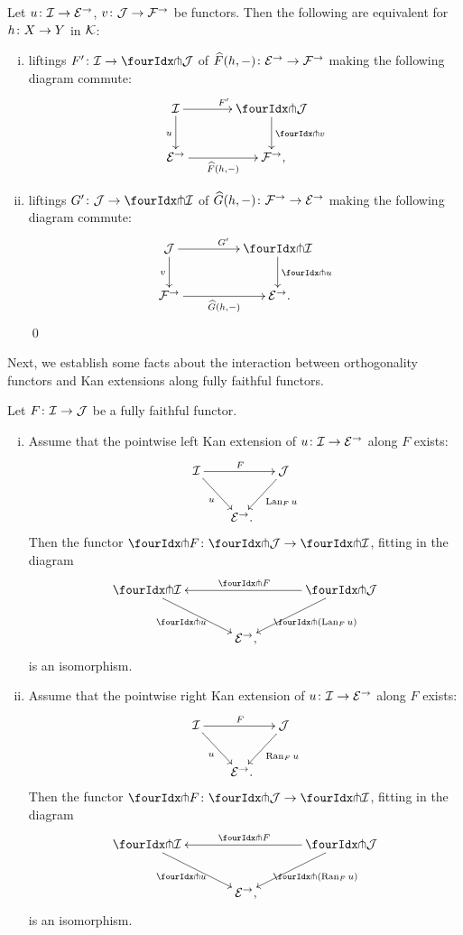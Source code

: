 \documentclass[reqno,10pt,a4paper,oneside,draft]{amsart}
\begin{document}
{{\begin{proposition} \label{lift-of-leibniz-adjunction}
Let $u \co \cal{I} \to \catE^\to$, $v \co \cal{J} \to \cal{F}^\to$ be functors.
Then the following are equivalent for $h \co X \to Y$ in $\cal{K}$:
\begin{enumerate}[(i)]
\item liftings $F' \co \cal{I} \to \liftl{\cal{J}}$ of $\widehat{F}(h, \arghole) \co \catE^\to \to \cal{F}^\to$ making the following diagram commute:
\[
\xymatrix@C=1.2cm{
  \cal{I}
  \ar[r]^{F'}
  \ar[d]_{u}
&
  \liftl{\cal{J}}
  \ar[d]^{\liftl{v}}
\\
  \catE^\to
  \ar[r]_-{\widehat{F}(h, \arghole)}
&
  \cal{F}^\to
\rlap{,}}
\]
\item liftings $G' \co \cal{J} \to \liftr{\cal{I}}$ of $\widehat{G}(h, \arghole) \co \cal{F}^\to \to \catE^\to$ making the following diagram commute:
\[
\begin{gathered}
\xymatrix@C+2em{
  \cal{J}
  \ar[d]_{v}
  \ar[r]^{G'}
&
  \liftr{\cal{I}}
  \ar[d]^{\liftr{u}}
\\
  \cal{F}^\to
  \ar[r]_-{\widehat{G}(h, \arghole)}
&
  \catE^\to  
\rlap{.}}
\end{gathered}
\]
 \qed
\end{enumerate}
\end{proposition}


Next, we establish some facts about the interaction between orthogonality functors and Kan extensions along fully faithful functors.

\begin{proposition} \label{kan-extension-closure}
Let $F \co \cal{I} \to \cal{J}$ be a fully faithful functor.
\begin{enumerate}[(i)]
\item Assume that the pointwise left Kan extension of $u \co \cal{I} \to \catE^\to$ along $F$ exists:
\[
\xymatrix@!C@C-1em{
  \cal{I}
  \ar[dr]_{u}
  \ar[rr]^{F}
&&
  \cal{J}
  \ar[dl]^{\Lan_F u}
\\&
  \catE^\to
\rlap{.}}
\]
Then the functor $\liftr{F} \co \liftr{\cal{J}} \to \liftr{\cal{I}}$, fitting in the diagram
\[
\xymatrix@!C@C-1em{
  \liftr{\cal{I}}
  \ar[dr]_{\liftr{u}}
&&
  \liftr{\cal{J}}
  \ar[ll]_{\liftr{F}}
  \ar[dl]^{\liftr{(\Lan_F u)}}
\\&
  \catE^\to
\rlap{,}}
\]
is an isomorphism.
\item Assume that the pointwise right Kan extension of $u \co \cal{I} \to \catE^\to$ along $F$ exists:
\[
\xymatrix@!C@C-1em{
  \cal{I}
  \ar[dr]_{u}
  \ar[rr]^{F}
&&
  \cal{J}
  \ar[dl]^{\Ran_F u}
\\&
  \catE^\to
\rlap{.}}
\]
Then the functor $\liftl{F} \co \liftl{\cal{J}} \to \liftl{\cal{I}}$, fitting in the diagram
\[
\xymatrix@!C@C-1em{
  \liftl{\cal{I}}
  \ar[dr]_{\liftl{u}}
&&
  \liftl{\cal{J}}
  \ar[ll]_{\liftl{F}}
  \ar[dl]^{\liftl{(\Ran_F u)}}
\\&
  \catE^\to
\rlap{,}}
\]
is an isomorphism.
\end{enumerate}
\end{proposition}

}}
\end{document}
